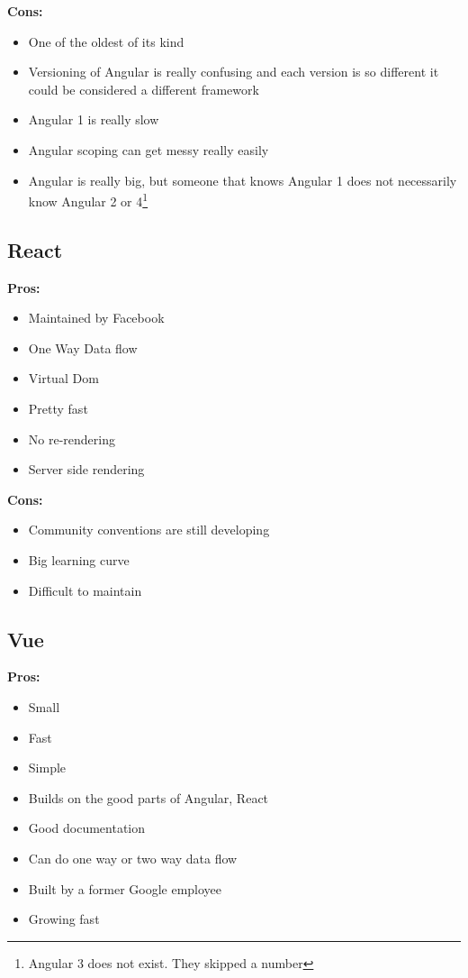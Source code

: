 \documentclass[draftclsnofoot,onecolumn,letterpaper,10pt,compsoc]{IEEEtran}
\begin{document}
    \textbf{Cons:}
    \begin{itemize}
      \item One of the oldest of its kind
      \item Versioning of Angular is really confusing and each version is so different it could be considered a different framework
      \item Angular 1 is really slow
      \item Angular scoping can get messy really easily
      \item Angular is really big, but someone that knows Angular 1 does not necessarily know Angular 2 or 4\footnote{Angular 3 does not exist. They skipped a number}
    \end{itemize}


	\subsection{React}
    \textbf{Pros:}
    \begin{itemize}
      \item Maintained by Facebook
      \item One Way Data flow
      \item Virtual Dom
      \item Pretty fast
      \item No re-rendering
      \item Server side rendering
    \end{itemize}

    \textbf{Cons:}
    \begin{itemize}
      \item Community conventions are still developing
      \item Big learning curve
      \item Difficult to maintain
    \end{itemize}


  \subsection{Vue}

    \textbf{Pros:}
    \begin{itemize}
      \item Small
      \item Fast
      \item Simple
      \item Builds on the good parts of Angular, React
      \item Good documentation
      \item Can do one way or two way data flow
      \item Built by a former Google employee
      \item Growing fast
    \end{itemize}
\end{document}
